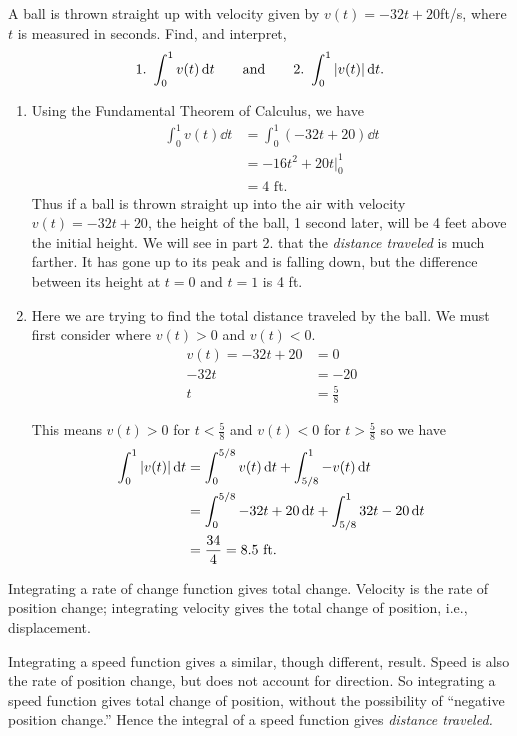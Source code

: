\begin{example}\label{ex_ftcmotion1}%
A ball is thrown straight up with velocity given by $v(t) = -32t+20$ft/s, where $t$ is measured in seconds. Find, and interpret,
\[1.\ \int_0^1 v(t)\dd t\qquad\text{and}\qquad 2.\ \int_0^1\abs{v(t)}\dd t.\]
\solution
\begin{enumerate}
\item Using the Fundamental Theorem of Calculus, we have 
\begin{align*}
	\int_0^1 v(t)\dd t &= \int_0^1 (-32t+20)\dd t \\
	&= -16t^2 + 20t\Big|_0^1 \\
	&= 4\text{ ft}.
\end{align*}
Thus if a ball is thrown straight up into the air with velocity $v(t) = -32t+20$, the height of the ball, 1 second later, will be 4 feet above the initial height. We will see in part 2. that the \emph{distance traveled} is much farther. It has gone up to its peak and is falling down, but the difference between its height at $t=0$ and $t=1$ is 4 ft.

\item Here we are trying to find the total distance traveled by the ball. We must first consider where $v(t)>0$ and $v(t)<0$.  
\begin{align*}
v(t)=-32t+20&=0\\
-32t&=-20\\
t&=\frac{5}{8}
\end{align*}

This means $v(t)>0$ for $t<\frac{5}{8}$ and $v(t)<0$ for $t>\frac{5}{8}$ so we have 
\begin{align*}
\int_0^1 \left\lvert v(t) \right\rvert\operatorname{d}\! t
&=\int_0^{5/8} v(t)\operatorname{d}\! t + \int_{5/8}^1 -v(t)\operatorname{d}\! t\\
&=\int_0^{5/8} -32t+20\operatorname{d}\! t + \int_{5/8}^1 32t-20\operatorname{d}\! t\\
&=\frac{34}{4}=8.5 \text{ ft}.
\end{align*}
\end{enumerate}
\end{example}

Integrating a rate of change function gives total change. Velocity is the rate of position change; integrating velocity gives the total change of position, i.e., displacement.

Integrating a speed function gives a similar, though different, result. Speed is also the rate of position change, but does not account for direction. So integrating a speed function gives total change of position, without the possibility of ``negative position change.'' Hence the integral of a speed function gives \emph{distance traveled.}

